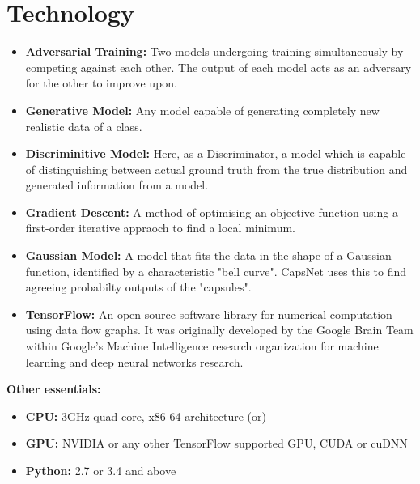 \chapter{Technology}\label{ch:technology}
\begin{itemize}
	\item\textbf{Adversarial Training:} Two models undergoing training simultaneously by competing against each other. The output of each model acts as an adversary for the other to improve upon.
	\item\textbf{Generative Model:} Any model capable of generating completely new realistic data of a class.
	\item\textbf{Discriminitive Model:} Here, as a Discriminator, a model which is capable of distinguishing between actual ground truth from the true distribution and generated information from a model.
	\item\textbf{Gradient Descent:} A method of optimising an objective function using a first-order iterative appraoch to find a local minimum.
	\item\textbf{Gaussian Model:} A model that fits the data in the shape of a Gaussian function, identified by a characteristic "bell curve". CapsNet uses this to find agreeing probabilty outputs of the "capsules".
	\item\textbf{TensorFlow:} An open source software library for numerical computation using data flow graphs. It was originally developed by the Google Brain Team within Google's Machine Intelligence research organization for machine learning and deep neural networks research.

\end{itemize}

\textbf{\Large Other essentials:}

\begin{itemize}
	\item\textbf{CPU:} 3GHz quad core, x86-64 architecture (or)
	\item\textbf{GPU:} NVIDIA or any other TensorFlow supported GPU, CUDA or cuDNN
	\item\textbf{Python:} 2.7 or 3.4 and above
\end{itemize}
